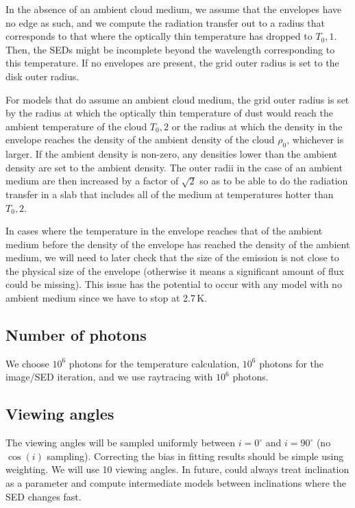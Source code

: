 \documentclass[10pt]{article}
\begin{document}
In the absence of an ambient cloud medium, we assume that the envelopes have no edge as such, and we compute the radiation transfer out to a radius that corresponds to that where the optically thin temperature has dropped to $T_0,1$. Then, the SEDs might be incomplete beyond the wavelength corresponding to this temperature. If no envelopes are present, the grid outer radius is set to the disk outer radius.

For models that do assume an ambient cloud medium, the grid outer radius is set by the radius at which the optically thin temperature of dust would reach the ambient temperature of the cloud $T_0,2$ or the radius at which the density in the envelope reaches the density of the ambient density of the cloud $\rho_0$, whichever is larger. If the ambient density is non-zero, any densities lower than the ambient density are set to the ambient density. The outer radii in the case of an ambient medium are then increased by a factor of $\sqrt{2}$ so as to be able to do the radiation transfer in a slab that includes all of the medium at temperatures hotter than $T_0,2$.

In cases where the temperature in the envelope reaches that of the ambient medium before the density of the envelope has reached the density of the ambient medium, we will need to later check that the size of the emission is not close to the physical size of the envelope (otherwise it means a significant amount of flux could be missing). This issue has the potential to occur with any model with no ambient medium since we have to stop at 2.7\,K.

\subsection{Number of photons}

We choose $10^6$ photons for the temperature calculation, $10^6$ photons for the image/SED iteration, and we use raytracing with $10^6$ photons.

\subsection{Viewing angles}

The viewing angles will be sampled uniformly between $i=0^\circ$ and $i=90^\circ$ (no $\cos(i)$ sampling). Correcting the bias in fitting results should be simple using weighting. We will use 10 viewing angles. In future, could always treat inclination as a parameter and compute intermediate models between inclinations where the SED changes fast.
\end{document}
